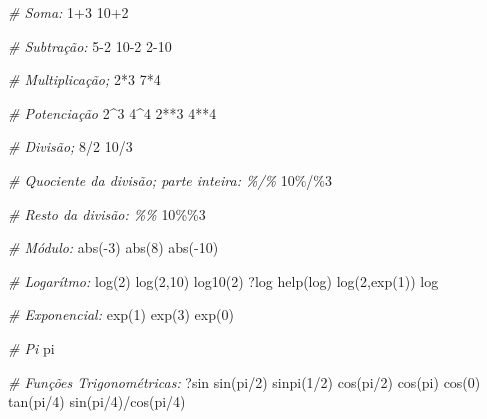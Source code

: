 \documentclass[
  brazilian,
]{book}
\newenvironment{Shaded}{\begin{snugshade}}{\end{snugshade}}
\newcommand{\CommentTok}[1]{\textcolor[rgb]{0.56,0.35,0.01}{\textit{#1}}}
\newcommand{\DecValTok}[1]{\textcolor[rgb]{0.00,0.00,0.81}{#1}}
\newcommand{\FunctionTok}[1]{\textcolor[rgb]{0.00,0.00,0.00}{#1}}
\newcommand{\NormalTok}[1]{#1}
\newcommand{\SpecialCharTok}[1]{\textcolor[rgb]{0.00,0.00,0.00}{#1}}
\begin{document}
\begin{Shaded}
\begin{Highlighting}[]
\CommentTok{\# Soma:}
\DecValTok{1}\SpecialCharTok{+}\DecValTok{3}
\DecValTok{10}\SpecialCharTok{+}\DecValTok{2}

\CommentTok{\# Subtração:}
\DecValTok{5{-}2}
\DecValTok{10{-}2}
\DecValTok{2{-}10}

\CommentTok{\# Multiplicação;}
\DecValTok{2}\SpecialCharTok{*}\DecValTok{3}
\DecValTok{7}\SpecialCharTok{*}\DecValTok{4}

\CommentTok{\# Potenciação}
\DecValTok{2}\SpecialCharTok{\^{}}\DecValTok{3}
\DecValTok{4}\SpecialCharTok{\^{}}\DecValTok{4}
\DecValTok{2}\SpecialCharTok{**}\DecValTok{3}
\DecValTok{4}\SpecialCharTok{**}\DecValTok{4}

\CommentTok{\# Divisão;}
\DecValTok{8}\SpecialCharTok{/}\DecValTok{2}
\DecValTok{10}\SpecialCharTok{/}\DecValTok{3}

\CommentTok{\# Quociente da divisão; parte inteira: \%/\%}
\DecValTok{10}\SpecialCharTok{\%/\%}\DecValTok{3}

\CommentTok{\# Resto da divisão: \%\%}
\DecValTok{10}\SpecialCharTok{\%\%}\DecValTok{3}

\CommentTok{\# Módulo:}
\FunctionTok{abs}\NormalTok{(}\SpecialCharTok{{-}}\DecValTok{3}\NormalTok{)}
\FunctionTok{abs}\NormalTok{(}\DecValTok{8}\NormalTok{)}
\FunctionTok{abs}\NormalTok{(}\SpecialCharTok{{-}}\DecValTok{10}\NormalTok{)}

\CommentTok{\# Logarítmo:}
\FunctionTok{log}\NormalTok{(}\DecValTok{2}\NormalTok{)}
\FunctionTok{log}\NormalTok{(}\DecValTok{2}\NormalTok{,}\DecValTok{10}\NormalTok{)}
\FunctionTok{log10}\NormalTok{(}\DecValTok{2}\NormalTok{)}
\NormalTok{?log}
\FunctionTok{help}\NormalTok{(log)}
\FunctionTok{log}\NormalTok{(}\DecValTok{2}\NormalTok{,}\FunctionTok{exp}\NormalTok{(}\DecValTok{1}\NormalTok{))}
\NormalTok{log}

\CommentTok{\# Exponencial:}
\FunctionTok{exp}\NormalTok{(}\DecValTok{1}\NormalTok{)}
\FunctionTok{exp}\NormalTok{(}\DecValTok{3}\NormalTok{)}
\FunctionTok{exp}\NormalTok{(}\DecValTok{0}\NormalTok{)}

\CommentTok{\# Pi}
\NormalTok{pi}

\CommentTok{\# Funções Trigonométricas:}
\NormalTok{?sin}
\FunctionTok{sin}\NormalTok{(pi}\SpecialCharTok{/}\DecValTok{2}\NormalTok{)}
\FunctionTok{sinpi}\NormalTok{(}\DecValTok{1}\SpecialCharTok{/}\DecValTok{2}\NormalTok{)}
\FunctionTok{cos}\NormalTok{(pi}\SpecialCharTok{/}\DecValTok{2}\NormalTok{)}
\FunctionTok{cos}\NormalTok{(pi)}
\FunctionTok{cos}\NormalTok{(}\DecValTok{0}\NormalTok{)}
\FunctionTok{tan}\NormalTok{(pi}\SpecialCharTok{/}\DecValTok{4}\NormalTok{)}
\FunctionTok{sin}\NormalTok{(pi}\SpecialCharTok{/}\DecValTok{4}\NormalTok{)}\SpecialCharTok{/}\FunctionTok{cos}\NormalTok{(pi}\SpecialCharTok{/}\DecValTok{4}\NormalTok{)}


\end{Highlighting}
\end{Shaded}
\end{document}
